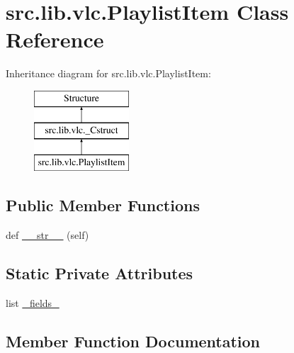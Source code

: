 \hypertarget{classsrc_1_1lib_1_1vlc_1_1PlaylistItem}{}\section{src.\+lib.\+vlc.\+Playlist\+Item Class Reference}
\label{classsrc_1_1lib_1_1vlc_1_1PlaylistItem}
Inheritance diagram for src.\+lib.\+vlc.\+Playlist\+Item\+:\begin{figure}[H]
\begin{center}
\leavevmode
\includegraphics[height=3.000000cm]{classsrc_1_1lib_1_1vlc_1_1PlaylistItem}
\end{center}
\end{figure}
\subsection*{Public Member Functions}
\begin{DoxyCompactItemize}
\item 
def \hyperlink{classsrc_1_1lib_1_1vlc_1_1PlaylistItem_aae149d64fbf9e63a80d3d933b5b96c13}{\+\_\+\+\_\+str\+\_\+\+\_\+} (self)
\end{DoxyCompactItemize}
\subsection*{Static Private Attributes}
\begin{DoxyCompactItemize}
\item 
list \hyperlink{classsrc_1_1lib_1_1vlc_1_1PlaylistItem_a2c57ccd1c1c910833819ecf7af7aeb84}{\+\_\+fields\+\_\+}
\end{DoxyCompactItemize}


\subsection{Member Function Documentation}
\hypertarget{classsrc_1_1lib_1_1vlc_1_1PlaylistItem_aae149d64fbf9e63a80d3d933b5b96c13}{}
